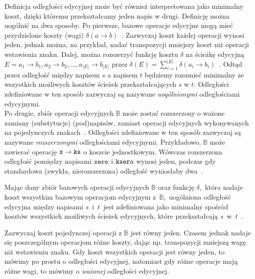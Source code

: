 \documentclass{praca1}
\begin{document}
Definicja odległości edycyjnej może być również interpretowana jako minimalny koszt, dzięki któremu przekształcamy jeden napis w drugi. Definicję można uogólnić na dwa sposoby. Po pierwsze, bazowe operacje edycyjne mogą mieć przydzielone koszty (wagi) $\delta(a \rightarrow b)$~\cite{Wagner1974:stringtostring}. Zazwyczaj koszt każdej operacji wynosi jeden, jednak można, na przykład, nadać transpozycji mniejszy koszt niż operacji wstawienia znaku. Dalej, można rozszerzyć funkcję kosztu $\delta$ na ścieżkę edycyjną $E = a_1 \rightarrow b_1, a_2 \rightarrow b_2, \ldots, a_{|E|} \rightarrow b_{|E|}$ przez $\delta(E) = \sum\limits_{i=1}^{|E|}\delta(a_i \rightarrow b_i)$~\cite{Boytsov2011:indexingmethods}. Odtąd przez odległość między napisem $s$ a napisem $t$ będziemy rozumieć minimalny ze wszystkich możliwych kosztów ścieżek przekształcających $s$ w $t$. Odległości zdefiniowane w ten sposób zazwyczaj są nazywane \emph{uogólnionymi} odległościami edycyjnymi.\\
Po drugie, zbiór operacji edycyjnych $\mathbb{B}$ może zostać rozszerzony o ważone zamiany (substytucje) (pod)napisów, zamiast operacji edycyjnych wykonywanych na pojedynczych znakach~\cite{Ukkonen1985:algorithmsforapprox}. Odległości zdefiniowane w ten sposób zazwyczaj są nazywane \emph{rozszerzonymi} odległościami edycyjnymi. Przykładowo, $\mathbb{B}$ może zawierać operację $\verb|x| \rightarrow \verb|ks|$ o koszcie jednostkowym. Wówczas rozszerzona odległość pomiędzy napisami $\verb|xero|$ i $\verb|ksero|$ wynosi jeden, podczas gdy standardowa (zwykła, nierozszerzona) odległość wyniosłaby dwa~\cite{Boytsov2011:indexingmethods}.

\begin{definition}\label{def:002}
Mając dany zbiór bazowych operacji edycyjnych $\mathbb{B}$ oraz funkcję $\delta$,~która nadaje koszt wszystkim bazowym operacjom edycyjnym z~$\mathbb{B}$,~uogólniona odległość edycyjna między napisami $s$~i~$t$~jest zdefiniowana jako minimalny spośród kosztów wszystkich możliwych ścieżek edycyjnych, które przekształcają $s$~w~$t$~\cite{Boytsov2011:indexingmethods}.
\end{definition}

Zazwyczaj koszt pojedynczej operacji z $\mathbb{B}$ jest równy jeden. Czasem jednak nadaje się poszczególnym operacjom różne koszty, dając np. transpozycji mniejszą wagę niż wstawieniu znaku. Gdy koszt wszystkich operacji jest równy jeden, to mówimy po prostu o odległości edycyjnej, natomiast gdy różne operacje mają różne wagi, to mówimy o \emph{ważonej} odległości edycyjnej.
\end{document}
